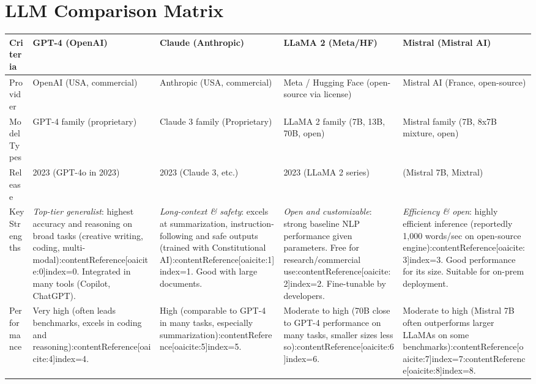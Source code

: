 \documentclass{article.cls}
\begin{document}
    \section{LLM Comparison Matrix}
    \begin{longtable}{|>{\raggedright}p{3cm}|>{\raggedright}p{3cm}|>{\raggedright}p{3cm}|>{\raggedright}p{3cm}|>{\raggedright\arraybackslash}p{3cm}|}
        \hline
        \textbf{Criteria} & \textbf{GPT-4 (OpenAI)} & \textbf{Claude (Anthropic)} & \textbf{LLaMA 2 (Meta/HF)} & \textbf{Mistral (Mistral AI)} \\
        \hline
        Provider & OpenAI (USA, commercial) & Anthropic (USA, commercial) & Meta / Hugging Face (open-source via license) & Mistral AI (France, open-source) \\
        \hline
        Model Types & GPT-4 family (proprietary) & Claude 3 family (Proprietary) & LLaMA 2 family (7B, 13B, 70B, open) & Mistral family (7B, 8x7B mixture, open) \\
        \hline
        Release & 2023 (GPT-4o in 2023) & 2023 (Claude 3, etc.) & 2023 (LLaMA 2 series) & 2023 (Mistral 7B, Mixtral) \\
        \hline
        Key Strengths & \textit{Top-tier generalist}: highest accuracy and reasoning on broad tasks (creative writing, coding, multi-modal):contentReference[oaicite:0]{index=0}. Integrated in many tools (Copilot, ChatGPT). & \textit{Long-context \& safety}: excels at summarization, instruction-following and safe outputs (trained with Constitutional AI):contentReference[oaicite:1]{index=1}. Good with large documents. & \textit{Open and customizable}: strong baseline NLP performance given parameters. Free for research/commercial use:contentReference[oaicite:2]{index=2}. Fine-tunable by developers. & \textit{Efficiency \& open}: highly efficient inference (reportedly 1,000 words/sec on open-source engine):contentReference[oaicite:3]{index=3}. Good performance for its size. Suitable for on-prem deployment. \\
        \hline
        Performance & Very high (often leads benchmarks, excels in coding and reasoning):contentReference[oaicite:4]{index=4}. & High (comparable to GPT-4 in many tasks, especially summarization):contentReference[oaicite:5]{index=5}. & Moderate to high (70B close to GPT-4 performance on many tasks, smaller sizes less so):contentReference[oaicite:6]{index=6}. & Moderate to high (Mistral 7B often outperforms larger LLaMAs on some benchmarks):contentReference[oaicite:7]{index=7}:contentReference[oaicite:8]{index=8}. \\

\end{longtable}
\end{document}
